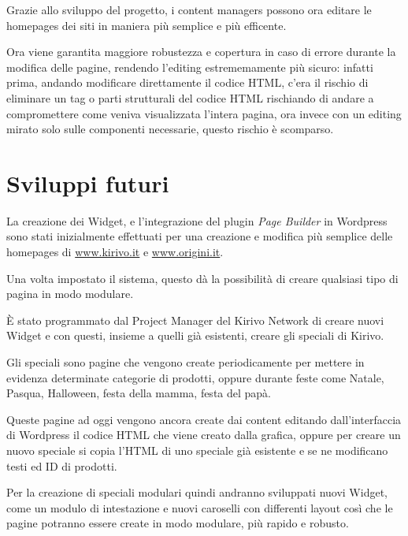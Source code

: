 
Grazie allo sviluppo del progetto, i content managers possono ora editare le
homepages dei siti in maniera più semplice e più efficente.

Ora viene garantita maggiore robustezza e copertura in caso di errore durante la modifica delle pagine,
rendendo l'editing estrememamente più sicuro: infatti prima, andando modificare direttamente il codice HTML, c'era il rischio di eliminare
un tag o parti strutturali del codice HTML rischiando di andare a compromettere come veniva visualizzata l'intera pagina,
ora invece con un editing mirato solo sulle componenti necessarie, questo rischio è scomparso.

\section{Sviluppi futuri}

La creazione dei Widget, e l'integrazione del plugin \emph{Page Builder} in Wordpress sono stati
inizialmente effettuati per una creazione e modifica più semplice delle homepages di \url{www.kirivo.it} 
e \url{www.origini.it}.

Una volta impostato il sistema, questo dà la possibilità di creare qualsiasi tipo di pagina in modo modulare.

È stato programmato dal Project Manager del Kirivo Network di creare nuovi Widget e con questi, insieme a quelli 
già esistenti, creare gli speciali di Kirivo.

Gli speciali sono pagine che vengono create periodicamente per mettere in evidenza determinate categorie di prodotti,
oppure durante feste come Natale, Pasqua, Halloween, festa della mamma, festa del papà.

Queste pagine ad oggi vengono ancora create dai content editando dall'interfaccia di Wordpress il codice HTML che
viene creato dalla grafica, oppure per creare un nuovo speciale si copia l'HTML di uno speciale già esistente e se ne modificano testi
ed ID di prodotti.

Per la creazione di speciali modulari quindi andranno sviluppati nuovi Widget, come un modulo di intestazione
e nuovi caroselli con differenti layout così che le pagine potranno essere create in modo modulare, più rapido
e robusto.

